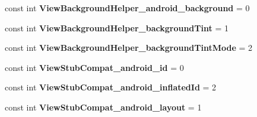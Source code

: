 \begin{DoxyCompactItemize}
const int {\bfseries View\+Background\+Helper\+\_\+android\+\_\+background} = 0
\item 
\mbox{\label{class_pinned_app_1_1_droid_1_1_resource_1_1_styleable_a156755dea5e18a6d2620025ce6128a5d}} 
const int {\bfseries View\+Background\+Helper\+\_\+background\+Tint} = 1
\item 
\mbox{\label{class_pinned_app_1_1_droid_1_1_resource_1_1_styleable_a7d09bb405caf2bee697e89715b5e4978}} 
const int {\bfseries View\+Background\+Helper\+\_\+background\+Tint\+Mode} = 2
\item 
\mbox{\label{class_pinned_app_1_1_droid_1_1_resource_1_1_styleable_a5f16a269a5bb960b9d660b77d50cb723}} 
const int {\bfseries View\+Stub\+Compat\+\_\+android\+\_\+id} = 0
\item 
\mbox{\label{class_pinned_app_1_1_droid_1_1_resource_1_1_styleable_a7c4857169273974fb3b13e3989e5be19}} 
const int {\bfseries View\+Stub\+Compat\+\_\+android\+\_\+inflated\+Id} = 2
\item 
\mbox{\label{class_pinned_app_1_1_droid_1_1_resource_1_1_styleable_a75489458c7ba9eb5be07c6ff62a708d4}} 
const int {\bfseries View\+Stub\+Compat\+\_\+android\+\_\+layout} = 1
\end{DoxyCompactItemize}
